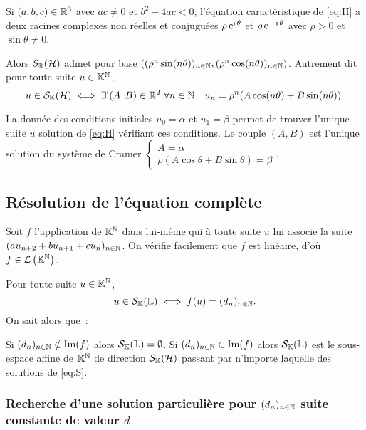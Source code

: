 \begin{theo}
  Si \((a,b,c) \in \mathbb{R}^3\) avec \(ac \neq 0\) et \(b^2-4ac <0\), l'équation 
  caractéristique de \eqref{eq:H} a deux racines complexes non réelles et 
  conjuguées \(\rho \operatorname{e}^{\operatorname{i} \theta}\) et \(\rho \operatorname{e}^{-\operatorname{i} \theta}\) avec 
  \(\rho>0\) et \(\sin \theta \neq 0\).

  Alors \(S_{\mathbb{R}}(\mathcal{H})\) admet pour base \(((\rho^n \sin(n \theta))_{n \in 
  \mathbb{N}},(\rho^n \cos(n \theta))_{n \in \mathbb{N}})\). Autrement dit pour toute suite 
  \(u \in \mathbb{K}^{\mathbb{N}}\),
  \begin{equation}
    u \in \S_\K(\H) \iff \exists! (A,B) \in \R^2 \ \forall n \in \N \quad u_n 
    = \rho^n(A \cos(n\theta) +B\sin(n\theta)).
  \end{equation}
\end{theo}
La donnée des conditions initiales \(u_0=\alpha\) et \(u_1=\beta\) permet de 
trouver l'unique suite \(u\) solution de \eqref{eq:H} vérifiant ces 
conditions. Le couple \((A,B)\) est l'unique solution du système de Cramer 
\(\begin{cases} A =\alpha \\ \rho(A\cos \theta +B \sin\theta) =\beta 
\end{cases}\).


\subsection{Résolution de l'équation complète}

Soit \(f\) l'application de \(\mathbb{K}^{\mathbb{N}}\) dans lui-même qui à toute suite \(u\) 
lui associe la suite \((au_{n+2}+bu_{n+1}+cu_n)_{n \in \mathbb{N}}\). On vérifie 
facilement que \(f\) est linéaire, d'où \(f \in \mathcal{L}\left(\mathbb{K}^{\mathbb{N}}\right)\).

Pour toute suite \(u \in \mathbb{K}^{\mathbb{N}}\),
\begin{equation}
  u \in \mathcal{S}_{\mathbb{K}}(\mathbb{L}) \iff f(u) = (d_n)_{n \in \mathbb{N}}.
\end{equation}
On sait alors que~:
\begin{prop}
  Si \((d_n)_{n \in \mathbb{N}} \notin \operatorname{Im}(f)\) alors \(\mathcal{S}_{\mathbb{K}}(\mathbb{L}) = \emptyset\). Si 
  \((d_n)_{n \in \mathbb{N}} \in \operatorname{Im}(f)\) alors \(\mathcal{S}_{\mathbb{K}}(\mathbb{L})\) est le sous-espace 
  affine de \(\mathbb{K}^{\mathbb{N}}\) de direction \(\mathcal{S}_{\mathbb{K}}(\mathcal{H})\) passant par n'importe 
  laquelle des solutions de \eqref{eq:S}.
\end{prop}

\subsubsection{Recherche d'une solution particulière pour \((d_n)_{n \in \mathbb{N}}\) 
suite constante de valeur \(d\)}

